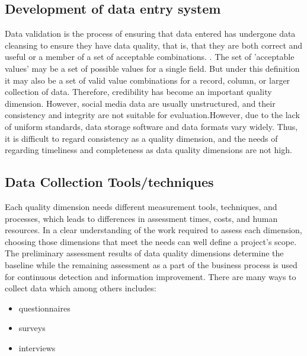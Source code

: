 \documentclass[12pt,]{article}
\begin{document}
\subsection*{Development of data entry system} 
Data validation is the process of ensuring that data entered has undergone data cleansing to ensure they have data quality, that is, that they are both correct and useful or a member of a set of acceptable combinations. .
The set of 'acceptable values' may be a set of possible values for a single field. But under this definition it may also be a set of valid value combinations for a record, column, or larger collection of data. Therefore, credibility has become an important quality dimension. However, social media data are usually unstructured, and their consistency and integrity are not suitable for evaluation.However, due to the lack of uniform standards, data storage software and data formats vary widely. Thus, it is difficult to regard consistency as a quality dimension, and the needs of regarding timeliness and completeness as data quality dimensions are not high. 
\subsection*{Data Collection Tools/techniques}
Each quality dimension needs different measurement tools, techniques, and processes, which leads to differences in assessment times, costs, and human resources. In a clear understanding of the work required to assess each dimension, choosing those dimensions that meet the needs can well define a project's scope. The preliminary assessment results of data quality dimensions determine the baseline while the remaining assessment as a part of the business process is used for continuous detection and information improvement. 
 There are many ways to collect data which among others includes:
 \begin{itemize}
 \item questionnaires
 \item surveys
 \item interviews
 \end{itemize} 
\end{document}

